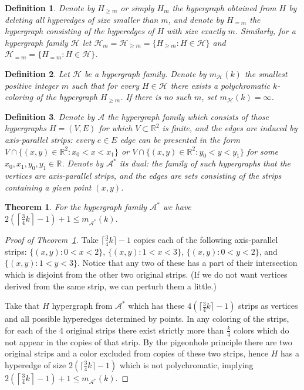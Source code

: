 \documentclass[10pt,a4paper]{amsart}
\newcommand{\R}{\mathbb{R}}
\newcommand{\HH}{\mathcal{H}}
\newcommand{\A}{\mathcal{A}}
\newtheorem{theorem}{Theorem}
\newtheorem{definition}{Definition}
\begin{document}
\begin{definition} Denote by $H_{\ge m}$ or simply $H_m$ the hypergraph obtained from $H$ by deleting all hyperedges of size smaller than $m$, and denote by $H_{=m}$ the hypergraph consisting of the hyperedges of $H$ with size exactly $m$. Similarly, for a hypergraph family $\mathcal{H}$ let $\HH_m=\HH_{\ge m}=\{H_{\ge m}:H\in\HH\}$ and $\HH_{=m}=\{H_{=m}:H\in\HH\}$.
\end{definition}

\begin{definition} Let $\mathcal{H}$ be a hypergraph family. Denote by $m_\mathcal{H}(k)$ the smallest positive integer $m$ such that for every $H\in\mathcal{H}$ there exists a polychromatic $k$-coloring of the hypergraph $H_{\ge m}$. If there is no such $m$, set $m_{\mathcal{H}}(k)=\infty$.
\end{definition}

\begin{definition} Denote by $\A$ the hypergraph family which consists of those hypergraphs $H=(V,E)$ for which $V\subset \R^2$ is finite, and the edges are induced by axis-parallel strips: every $e\in E$ edge can be presented in the form $V\cap\{(x,y)\in\R^2: x_0<x<x_1\}$ or $V\cap\{(x,y)\in\R^2: y_0<y<y_1\}$ for some $x_0, x_1, y_0, y_1 \in\R$. Denote by $\A^*$ its dual: the family of such hypergraphs that the vertices are axis-parallel strips, and the edges are sets consisting of the strips containing a given point $(x,y)$. 
\end{definition}

\begin{theorem}\label{strip_dual}
For the hypergraph family $\A^*$ we have 
$2\left(\left\lceil \frac{3}{4}k\right\rceil -1\right) + 1 \leq m_{\A^*}(k)$.
\end{theorem}

\begin{proof}[Proof of Theorem~\ref{strip_dual}]

Take $\lceil \frac{3}{4}k\rceil-1$ copies each of the following axis-parallel strips: $\{(x,y):0<x<2\}$, $\{(x,y):1<x<3\}$, $\{(x,y):0<y<2\}$, and $\{(x,y):1<y<3\}$. Notice that any two of these has a part of their intersection which is disjoint from the other two original strips. (If we do not want vertices derived from the same strip, we can perturb them a little.)

Take that $H$ hypergraph from $\A^*$ which has these $4(\lceil \frac{3}{4}k\rceil-1)$ strips as vertices and all possible hyperedges determined by points. In any coloring of the strips, for each of the 4 original strips there exist strictly more than $\frac{k}{4}$ colors which do not appear in the copies of that strip. By the pigeonhole principle there are two original strips and a color excluded from copies of these two strips, hence $H$ has a hyperedge of size $2(\lceil \frac{3}{4}k\rceil-1)$ which is not polychromatic, implying $2\left(\left\lceil \frac{3}{4}k\right\rceil -1\right) + 1 \leq m_{\A^*}(k)$.
\end{proof}
\end{document}
